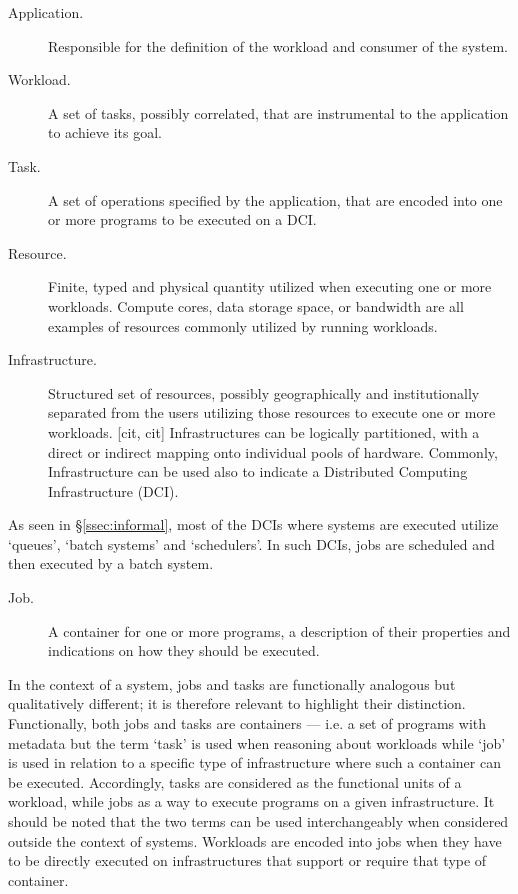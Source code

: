 \documentclass{sig-alternate}
\begin{document}
\begin{description}

\item[Application.] Responsible for the definition of the workload and consumer
of the \pilotjob system.

\item[Workload.] A set of tasks, possibly correlated, that are instrumental to
the application to achieve its goal.

\item[Task.] A set of operations specified by the application, that are encoded
into one or more programs to be executed on a DCI. 

\item[Resource.] Finite, typed and physical quantity utilized when
  executing one or more workloads. Compute cores, data storage space,
  or bandwidth are all examples of resources commonly utilized by
  running workloads.

\item[Infrastructure.] Structured set of resources, possibly geographically and
institutionally separated from the users utilizing those resources to execute
one or more workloads. [cit, cit] Infrastructures can be logically partitioned,
with a direct or indirect mapping onto individual pools of hardware. Commonly,
Infrastructure can be used also to indicate a Distributed Computing
Infrastructure (DCI). 

\end{description}

As seen in \S\ref{ssec:informal}, most of the DCIs where \pilotjobs systems
are executed utilize `queues', `batch systems' and `schedulers'. In such DCIs,
jobs are scheduled and then executed by a batch system.

\begin{description}

\item[Job.] A container for one or more programs, a description of their
  properties and indications on how they should be executed.

\end{description}

In the context of a \pilotjob system, jobs and tasks are functionally analogous
but qualitatively different; it is therefore relevant to highlight their
distinction. Functionally, both jobs and tasks are containers --- i.e. a set of
programs with metadata but the term `task' is used when reasoning about
workloads while `job' is used in relation to a specific type of infrastructure
where such a container can be executed. Accordingly, tasks are considered as
the functional units of a workload, while jobs as a way to execute programs on
a given infrastructure. It should be noted that the two terms can be used
interchangeably when considered outside the context of \pilotjob systems.
Workloads are encoded into jobs when they have to be directly executed on
infrastructures that support or require that type of container.
\end{document}
